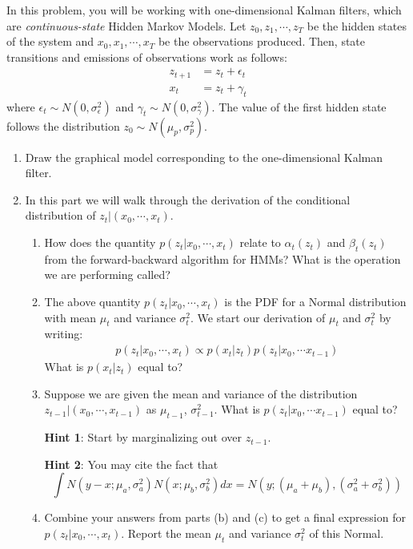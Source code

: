 \documentclass[submit]{harvardml}
\newcommand{\sigeps}{\sigma_{\epsilon}}
\newcommand{\siggam}{\sigma_{\gamma}}
\newcommand{\muzp}{\mu_{p}}
\newcommand{\sigzp}{\sigma_{p}}
\begin{document}
\begin{problem}
In this problem, you will be working with one-dimensional Kalman filters, which are \textit{continuous-state} Hidden Markov Models. Let $z_0, z_1, \cdots , z_T$ be the hidden states of the system and $x_0, x_1, \cdots, x_T$ be the observations produced. Then, state transitions and emissions of observations work as follows:
  \begin{eqnarray*}
    z_{t+1} &= z_{t} + \epsilon_{t} \\
    x_{t} & = z_{t} + \gamma_{t}
  \end{eqnarray*}
 where $\epsilon_t \sim N(0,\sigeps^2)$ and $\gamma_t \sim N(0,\siggam^2)$. The value of the first hidden state follows the distribution $z_0 \sim N(\muzp,\sigzp^2)$.

\begin{enumerate}
  \item Draw the graphical model corresponding to the one-dimensional Kalman filter.
  \item In this part we will walk through the derivation of the conditional distribution of $z_t|(x_0, \cdots, x_{t})$.
  \begin{enumerate}
      \item How does the quantity $p(z_t| x_0, \cdots, x_{t})$ relate to $\alpha_t(z_t)$ and $\beta_t(z_t)$ from the forward-backward algorithm for HMMs?  What is the operation we are performing called?
      \item The above quantity $p(z_t|x_0, \cdots, x_t)$ is the PDF for a Normal distribution with mean $\mu_t$ and variance $\sigma_t^2$. We start our derivation of $\mu_t$ and $\sigma_t^2$ by writing:
      \begin{align*}
          p(z_t|x_0, \cdots, x_t) \propto p(x_t|z_t)p(z_t|x_0, \cdots x_{t-1})
      \end{align*}
      What is $p(x_t|z_t)$ equal to?
      \item Suppose we are given the mean and variance of the distribution $z_{t-1}|(x_0, \cdots, x_{t-1})$ as $\mu_{t-1}$, $\sigma^2_{t-1}$. What is $p(z_t|x_0, \cdots x_{t-1})$ equal to? 
      
      \textbf{Hint 1}: Start by marginalizing out over $z_{t-1}$.
      
      \textbf{Hint 2}: You may cite the fact that 
      \[\int N(y-x ; \mu_a, \sigma^2_a)N(x ; \mu_b, \sigma^2_b)dx = N(y ; (\mu_a + \mu_b), (\sigma^2_a + \sigma^2_b))\]
      \item Combine your answers from parts (b) and (c) to get a final expression for $p(z_t|x_0, \cdots, x_t)$. Report the mean $\mu_t$ and variance $\sigma_t^2$ of this Normal.
      

\end{enumerate}
\end{enumerate}
\end{problem}
\end{document}
